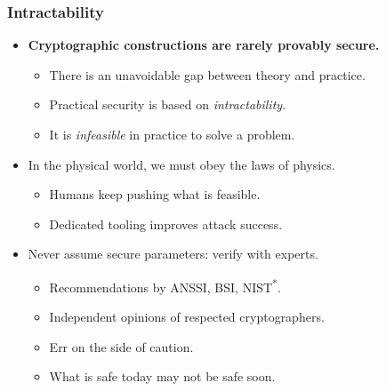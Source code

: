 \begin{frame}
  \frametitle{Intractability}

  \begin{itemize}
    \item \textbf{Cryptographic constructions are rarely provably secure.}
    \pause
    \begin{itemize}[<+(1)->]
      \item There is an unavoidable gap between theory and practice.
      \item Practical security is based on \emph{intractability}.
      \item It is \emph{infeasible} in practice to solve a problem.
    \end{itemize}

    \vspace*{1em}

    \pause
    \item In the physical world, we must obey the laws of physics.
    \begin{itemize}[<+(1)->]
      \item Humans keep pushing what is feasible.
      \item Dedicated tooling improves attack success.
    \end{itemize}
    
    \vspace*{1em}

    \pause
    \item Never assume secure parameters: verify with experts.
    \begin{itemize}[<+(1)->]
      \item Recommendations by ANSSI, BSI, NIST\textsuperscript{*}.
      \item Independent opinions of respected cryptographers.
      \item Err on the side of caution.
      \item What is safe today may not be safe soon.
    \end{itemize}
  \end{itemize}
\end{frame}

